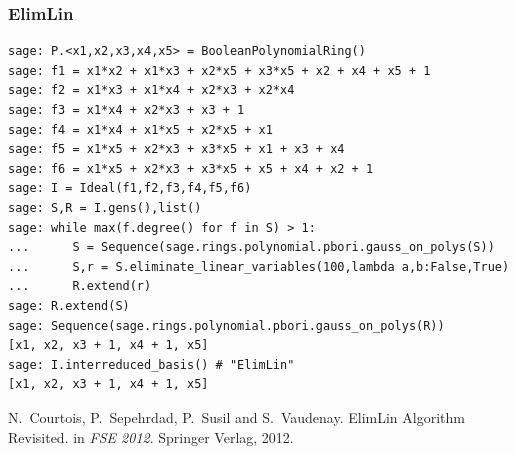 \documentclass[10pt]{beamer}
\begin{document}
\begin{frame}[fragile]
\frametitle{ElimLin}

\begin{lstlisting}
sage: P.<x1,x2,x3,x4,x5> = BooleanPolynomialRing()
sage: f1 = x1*x2 + x1*x3 + x2*x5 + x3*x5 + x2 + x4 + x5 + 1
sage: f2 = x1*x3 + x1*x4 + x2*x3 + x2*x4
sage: f3 = x1*x4 + x2*x3 + x3 + 1
sage: f4 = x1*x4 + x1*x5 + x2*x5 + x1
sage: f5 = x1*x5 + x2*x3 + x3*x5 + x1 + x3 + x4
sage: f6 = x1*x5 + x2*x3 + x3*x5 + x5 + x4 + x2 + 1
sage: I = Ideal(f1,f2,f3,f4,f5,f6)
sage: S,R = I.gens(),list()
sage: while max(f.degree() for f in S) > 1:
...      S = Sequence(sage.rings.polynomial.pbori.gauss_on_polys(S))
...      S,r = S.eliminate_linear_variables(100,lambda a,b:False,True)
...      R.extend(r)
sage: R.extend(S)
sage: Sequence(sage.rings.polynomial.pbori.gauss_on_polys(R))
[x1, x2, x3 + 1, x4 + 1, x5]
sage: I.interreduced_basis() # "ElimLin"
[x1, x2, x3 + 1, x4 + 1, x5]
\end{lstlisting}

\begin{thebibliography}{FOOBAR}
  N.\ Courtois, P.\ Sepehrdad, P.\ Susil and S.\ Vaudenay.
  \newblock ElimLin Algorithm Revisited.
  \newblock in {\em FSE 2012}. Springer Verlag, 2012.
\end{thebibliography}


\end{frame}
\end{document}
